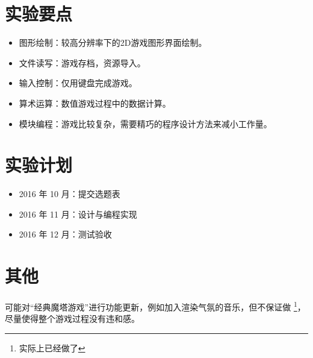 \section{实验要点}

\begin{itemize}
    \item 图形绘制：较高分辨率下的2D游戏图形界面绘制。
    \item 文件读写：游戏存档，资源导入。
    \item 输入控制：仅用键盘完成游戏。
    \item 算术运算：数值游戏过程中的数据计算。
    \item 模块编程：游戏比较复杂，需要精巧的程序设计方法来减小工作量。
\end{itemize}

\section{实验计划}

\begin{itemize}
    \item 2016 年 10 月：提交选题表
    \item 2016 年 11 月：设计与编程实现
    \item 2016 年 12 月：测试验收
\end{itemize}

\section{其他}

可能对“经典魔塔游戏”进行功能更新，例如加入渲染气氛的音乐，但不保证做 \footnote{实际上已经做了}，尽量使得整个游戏过程没有违和感。

